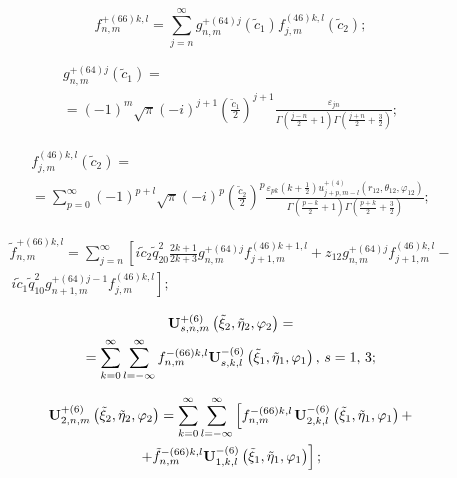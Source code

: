 \begin{russian}
\begin{equation}
f_{n,m}^{ + (66)k,l} = \sum\limits_{j = n}^\infty  {g_{n,m}^{ + (64)j}} ({\tilde c_1})f_{j,m}^{(46)k,l}({\tilde c_2});
\end{equation}

\begin{multline}
g_{n,m}^{ + (64)j}({\tilde c_1}) = \\
= {( - 1)^m}\sqrt \pi  {( - i)^{j + 1}}{\left( {\frac{{{{\tilde c}_1}}}{2}} \right)^{j + 1}}\frac{{{\varepsilon _{jn}}}}{{\Gamma \left( {\frac{{j - n}}{2} + 1} \right)\Gamma \left( {\frac{{j + n}}{2} + \frac{3}{2}} \right)}};
\end{multline}

\begin{multline}
f_{j,m}^{(46)k,l}({\tilde c_2}) = \\
= \sum\limits_{p = 0}^\infty  {{{( - 1)}^{p + l}}} \sqrt \pi  {( - i)^p}{\left( {\frac{{{{\tilde c}_2}}}{2}} \right)^p}\frac{{{\varepsilon _{pk}}\left( {k + \frac{1}{2}} \right)u_{j + p,m - l}^{ + (4)}\left( {{r_{12}},{\theta _{12}},{\varphi _{12}}} \right)}}{{\Gamma \left( {\frac{{p - k}}{2} + 1} \right)\Gamma \left( {\frac{{p + k}}{2} + \frac{3}{2}} \right)}};
\end{multline}

\begin{multline}
\tilde f_{n,m}^{ + (66)k,l} = \sum\limits_{j = n}^\infty  {\left[ {i{{\tilde c}_2}\tilde q_{20}^2\frac{{2k + 1}}{{2k + 3}}} \right.} g_{n,m}^{ + (64)j}f_{j + 1,m}^{(46)k + 1,l} + {z_{12}}g_{n,m}^{ + (64)j}f_{j + 1,m}^{(46)k,l} - \\
\left. {\frac{{}}{{}}i{{\tilde c}_1}\tilde q_{10}^2g_{n + 1,m}^{ + (64)j - 1}f_{j,m}^{(46)k,l}} \right];
\end{multline}

\begin{multline}
{\bf{U}}_{s,n,m}^{ + (6)}\left( {{{\tilde \xi }_2},{{\tilde \eta }_2},{\varphi _2}} \right) = \\
= \sum\limits_{k = 0}^\infty  {\sum\limits_{l =  - \infty }^\infty  {f_{n,m}^{ - (66)k,l}} } {\bf{U}}_{s,k,l}^{ - (6)}\left( {{{\tilde \xi }_1},{{\tilde \eta }_1},{\varphi _1}} \right),\,s = 1,{\mkern 1mu} {\kern 1pt} 3;
\label{eq:10:6}
\end{multline}

\begin{multline}
{\bf{U}}_{2,n,m}^{ + (6)}\left( {{{\tilde \xi }_2},{{\tilde \eta }_2},{\varphi _2}} \right) = \sum\limits_{k = 0}^\infty  {\sum\limits_{l =  - \infty }^\infty  {\left[ {f_{n,m}^{ - (66)k,l}} \right.} } {\bf{U}}_{2,k,l}^{ - (6)}\left( {{{\tilde \xi }_1},{{\tilde \eta }_1},{\varphi _1}} \right) + \\
\left. { + \tilde f_{n,m}^{ - (66)k,l}{\bf{U}}_{1,k,l}^{ - (6)}\left( {{{\tilde \xi }_1},{{\tilde \eta }_1},{\varphi _1}} \right)} \right];
\label{eq:10:7}
\end{multline}


\end{russian}
